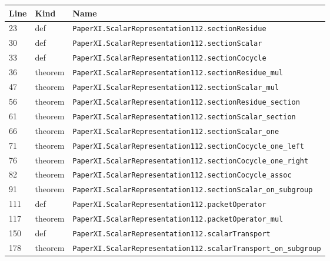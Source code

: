 \documentclass[10pt,oneside]{book}
\begin{document}
\begin{longtable}{@{}p{}p{}p{}@{}}\toprule Line&Kind&Name\\\midrule\endhead

23&def&\nolinkurl{PaperXI.ScalarRepresentation112.sectionResidue}\\

30&def&\nolinkurl{PaperXI.ScalarRepresentation112.sectionScalar}\\

33&def&\nolinkurl{PaperXI.ScalarRepresentation112.sectionCocycle}\\

36&theorem&\nolinkurl{PaperXI.ScalarRepresentation112.sectionResidue_mul}\\

47&theorem&\nolinkurl{PaperXI.ScalarRepresentation112.sectionScalar_mul}\\

56&theorem&\nolinkurl{PaperXI.ScalarRepresentation112.sectionResidue_section}\\

61&theorem&\nolinkurl{PaperXI.ScalarRepresentation112.sectionScalar_section}\\

66&theorem&\nolinkurl{PaperXI.ScalarRepresentation112.sectionScalar_one}\\

71&theorem&\nolinkurl{PaperXI.ScalarRepresentation112.sectionCocycle_one_left}\\

76&theorem&\nolinkurl{PaperXI.ScalarRepresentation112.sectionCocycle_one_right}\\

82&theorem&\nolinkurl{PaperXI.ScalarRepresentation112.sectionCocycle_assoc}\\

91&theorem&\nolinkurl{PaperXI.ScalarRepresentation112.sectionScalar_on_subgroup}\\

111&def&\nolinkurl{PaperXI.ScalarRepresentation112.packetOperator}\\

117&theorem&\nolinkurl{PaperXI.ScalarRepresentation112.packetOperator_mul}\\

150&def&\nolinkurl{PaperXI.ScalarRepresentation112.scalarTransport}\\

178&theorem&\nolinkurl{PaperXI.ScalarRepresentation112.scalarTransport_on_subgroup}\\


\end{longtable}
\end{document}
